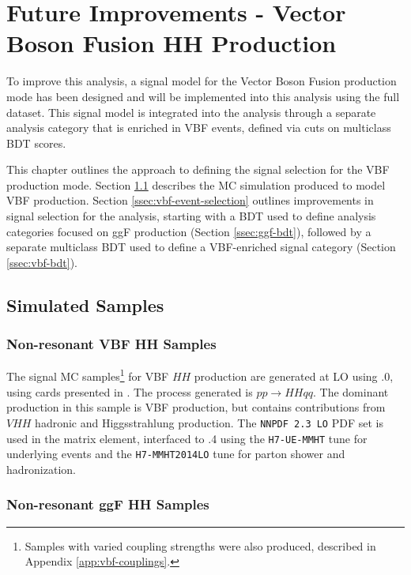 
\chapter{Future Improvements - Vector Boson Fusion HH Production} \label{ch:vbf}

To improve this analysis, a signal model for the Vector Boson Fusion production mode has been designed and will be implemented into this analysis using the full \RunTwo dataset. This signal model is integrated into the analysis through a separate analysis category that is enriched in VBF events, defined via cuts on multiclass \gls{BDT} scores.

This chapter outlines the approach to defining the signal selection for the \gls{VBF} production mode. Section \ref{sec:vbf-samples} describes the \gls{MC} simulation produced to model VBF \hhyybb production. Section \ref{ssec:vbf-event-selection} outlines improvements in signal selection for the analysis, starting with a \gls{BDT} used to define analysis categories focused on ggF \hh production (Section \ref{ssec:ggf-bdt}), followed by a separate multiclass \gls{BDT} used to define a VBF-enriched signal category (Section \ref{ssec:vbf-bdt}).

\section{Simulated Samples} \label{sec:vbf-samples}

\subsection{Non-resonant VBF HH Samples} \label{ssec:vbf-samples-production}

The signal MC samples\footnote{Samples with varied coupling strengths were also produced, described in Appendix \ref{app:vbf-couplings}.} for VBF $HH$ production are generated at LO using .0, using cards presented in \cite{vbfhh}. The process generated is $pp \rightarrow HHqq$. The dominant production in this sample is VBF \hh production, but contains contributions from $VHH$  hadronic and Higgsstrahlung production. The \texttt{NNPDF 2.3 LO} PDF set \cite{NNPDF} is used in the matrix element, interfaced to .4 using the \texttt{H7-UE-MMHT} tune for underlying events and the \texttt{H7-MMHT2014LO} tune for parton shower and hadronization.

\subsection{Non-resonant ggF HH Samples}

